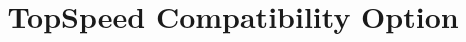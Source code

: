 \commontrue

\newcommand{\BookName}{TopSpeed Compatibility Option}
\ifonline\title{TopSpeed Compatibility Option}\fi

\makeindex

